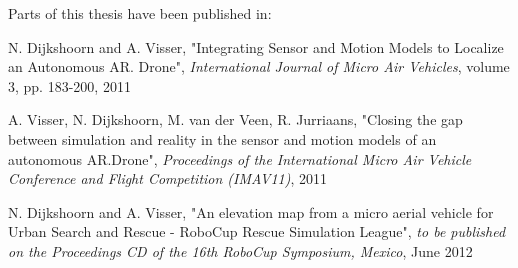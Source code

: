 \begin{comment}
Extensive experiments have validated that the approach works in a vast variety of environments. It has been shown that a visual compass can supply a mobile robot in natural environments with accurate heading estimates. Finally, it is shown in experiments that a robot using multiple compasses is able to estimate its translational pose.
\end{comment}

\vspace{\baselineskip}

Parts of this thesis have been published in:

\vspace{\baselineskip}

N. Dijkshoorn and A. Visser, "Integrating Sensor and Motion Models to Localize an Autonomous AR. Drone", \textit{International Journal of Micro Air Vehicles}, volume 3, pp. 183-200, 2011

\vspace{\baselineskip}

A. Visser, N. Dijkshoorn, M. van der Veen, R. Jurriaans, "Closing the gap between simulation and reality in the sensor and motion models of an autonomous AR.Drone", \textit{Proceedings of the International Micro Air Vehicle Conference and Flight Competition (IMAV11)}, 2011

\vspace{\baselineskip}

N. Dijkshoorn and A. Visser, "An elevation map from a micro aerial vehicle for Urban Search and Rescue - RoboCup Rescue Simulation League", \textit{to be published on the Proceedings CD of the 16th RoboCup Symposium, Mexico}, June 2012